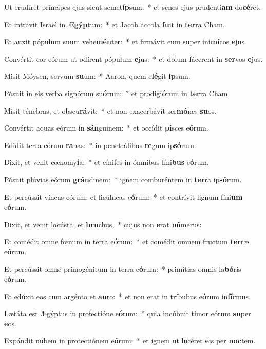 \item Ut erudíret príncipes ejus sicut semet\textbf{íp}sum:~* et senes ejus prudénti\textbf{am} do\textbf{cé}ret.
\item Et intrávit Israël in Æ\textbf{gýp}tum:~* et Jacob áccola \textbf{fu}it in \textbf{ter}ra Cham.
\item Et auxit pópulum suum vehe\textbf{mén}ter:~* et firmávit eum super ini\textbf{mí}cos \textbf{e}jus.
\item Convértit cor eórum ut odírent pópulum \textbf{e}jus:~* et dolum fácerent in \textbf{ser}vos \textbf{e}jus.
\item Misit Móysen, servum \textbf{su}um:~* Aaron, quem e\textbf{lé}git \textbf{ip}sum.
\item Pósuit in eis verba signórum su\textbf{ó}rum:~* et prodigi\textbf{ó}rum in \textbf{ter}ra Cham.
\item Misit ténebras, et obscu\textbf{rá}vit:~* et non exacerbávit ser\textbf{mó}nes \textbf{su}os.
\item Convértit aquas eórum in \textbf{sán}guinem:~* et occídit \textbf{pi}sces e\textbf{ó}rum.
\item Edidit terra eórum \textbf{ra}nas:~* in penetrálibus \textbf{re}gum ip\textbf{só}rum.
\item Dixit, et venit cœnomy\textbf{í}a:~* et cínifes in ómnibus fíni\textbf{bus} e\textbf{ó}rum.
\item Pósuit plúvias eórum \textbf{grán}dinem:~* ignem comburéntem in \textbf{ter}ra ip\textbf{só}rum.
\item Et percússit víneas eórum, et ficúlneas e\textbf{ó}rum:~* et contrívit lignum fíni\textbf{um} e\textbf{ó}rum.
\item Dixit, et venit locústa, et \textbf{bru}chus,~* cujus non \textbf{e}rat \textbf{nú}merus:
\item Et comédit omne fœnum in terra e\textbf{ó}rum:~* et comédit omnem fructum \textbf{ter}ræ e\textbf{ó}rum.
\item Et percússit omne primogénitum in terra e\textbf{ó}rum:~* primítias omnis la\textbf{bó}ris e\textbf{ó}rum.
\item Et edúxit eos cum argénto et \textbf{au}ro:~* et non erat in tríbubus e\textbf{ó}rum in\textbf{fír}mus.
\item Lætáta est Ægýptus in profectióne e\textbf{ó}rum:~* quia incúbuit timor eórum \textbf{su}per \textbf{e}os.
\item Expándit nubem in protectiónem e\textbf{ó}rum:~* et ignem ut lucéret \textbf{e}is per \textbf{noc}tem.

